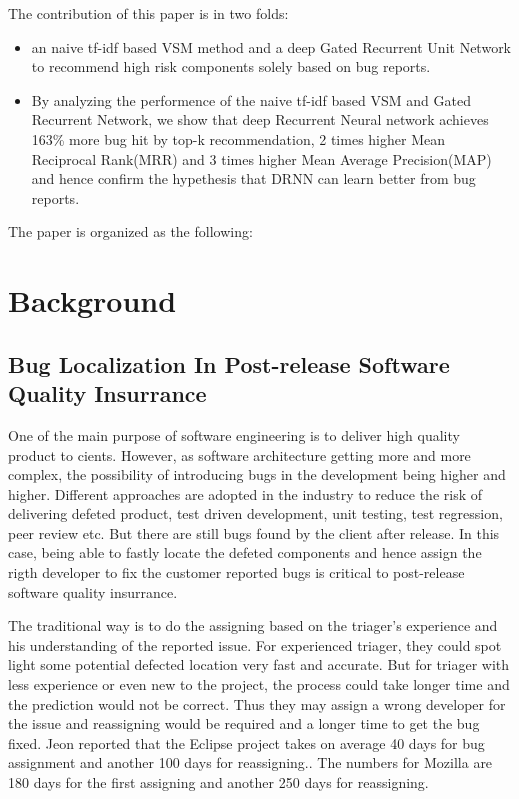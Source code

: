 The contribution of this paper is in two folds:  
\begin{itemize}
	\item an naive tf-idf based VSM method and a deep Gated Recurrent Unit Network to recommend high risk components solely based on bug reports.
	\item By analyzing the performence of the naive tf-idf based VSM and Gated Recurrent Network,  we show that deep Recurrent Neural network achieves 163\% more bug hit by top-k recommendation, 2 times higher Mean Reciprocal Rank(MRR) and 3 times higher Mean Average Precision(MAP) and hence confirm the hypethesis that DRNN can learn better from bug reports.
	\end{itemize}

The paper is organized as the following: 

\section{Background}
\subsection{Bug Localization In Post-release Software Quality Insurrance}
One of the main purpose of software engineering is to deliver high quality product to cients.
However, as software architecture getting more and more complex, the possibility of introducing bugs in the development being higher and higher.  
Different approaches are adopted in the industry to reduce the risk of delivering defeted product, test driven development, unit testing, test regression, peer review etc.
But there are still bugs found by the client after release. 
In this case, being able to fastly locate the defeted components and hence assign the rigth developer to fix the customer reported bugs is critical to post-release software quality insurrance. 

The traditional way is to do the assigning based on the triager's experience and his understanding of the reported issue. 
For experienced triager, they could spot light some potential defected location very fast and accurate.
But for triager with less experience or even new to the project, the process could take longer time and the prediction would not be correct.
Thus they may assign a wrong developer for the issue and reassigning would be required and a longer time to get the bug fixed. 
Jeon \etal \cite{jeong2009improving} reported that the Eclipse project takes on average 40 days for bug assignment and another 100 days for reassigning..
The numbers for Mozilla are 180 days for the first assigning and another 250 days for reassigning.

